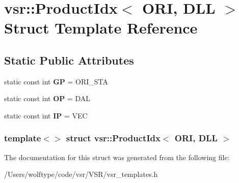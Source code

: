 \hypertarget{structvsr_1_1_product_idx_3_01_o_r_i_00_01_d_l_l_01_4}{\section{vsr\-:\-:Product\-Idx$<$ O\-R\-I, D\-L\-L $>$ Struct Template Reference}
\label{structvsr_1_1_product_idx_3_01_o_r_i_00_01_d_l_l_01_4}
}
\subsection*{Static Public Attributes}
\begin{DoxyCompactItemize}
\item 
\hypertarget{structvsr_1_1_product_idx_3_01_o_r_i_00_01_d_l_l_01_4_a3468163c5621c8751b8bfb75dd6df236}{static const int {\bfseries G\-P} = O\-R\-I\-\_\-\-S\-T\-A}\label{structvsr_1_1_product_idx_3_01_o_r_i_00_01_d_l_l_01_4_a3468163c5621c8751b8bfb75dd6df236}

\item 
\hypertarget{structvsr_1_1_product_idx_3_01_o_r_i_00_01_d_l_l_01_4_a114d8c939cd932fddb48b2f2f299deef}{static const int {\bfseries O\-P} = D\-A\-L}\label{structvsr_1_1_product_idx_3_01_o_r_i_00_01_d_l_l_01_4_a114d8c939cd932fddb48b2f2f299deef}

\item 
\hypertarget{structvsr_1_1_product_idx_3_01_o_r_i_00_01_d_l_l_01_4_a4e528a0fe1de43b7b82f37979f82e23a}{static const int {\bfseries I\-P} = V\-E\-C}\label{structvsr_1_1_product_idx_3_01_o_r_i_00_01_d_l_l_01_4_a4e528a0fe1de43b7b82f37979f82e23a}

\end{DoxyCompactItemize}
\subsubsection*{template$<$$>$ struct vsr\-::\-Product\-Idx$<$ O\-R\-I, D\-L\-L $>$}



The documentation for this struct was generated from the following file\-:\begin{DoxyCompactItemize}
\item 
/\-Users/wolftype/code/vsr/\-V\-S\-R/vsr\-\_\-templates.\-h\end{DoxyCompactItemize}
